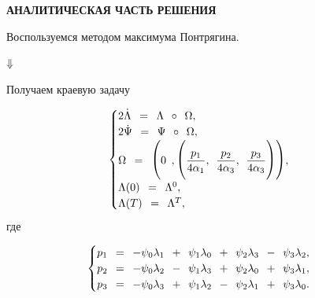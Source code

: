\documentclass[14pt]{extreport}
\begin{document}
\begin{landscape}
\begin{center}
 \huge{\textbf{АНАЛИТИЧЕСКАЯ ЧАСТЬ РЕШЕНИЯ}}
\end{center}

\begin{center}
\Large{Воспользуемся методом максимума Понтрягина.}
\end{center}

\large
\begin{center}
 $\Huge{\Downarrow}$
\end{center}

\begin{center}
\Large{Получаем краевую задачу}
\end{center}

\begin{equation}
\begin{cases}
\Large{2\dot{\Lambda}\ =\ \Lambda\ \circ\ \Omega,} \\
\Large{2\dot{\Psi}\ =\ \Psi\ \circ\ \Omega,} \\
\Large{\Omega\ =\ \bigg(0\ ,\bigg(\dfrac{p_1}{4\alpha_1},\ \dfrac{p_2}{4\alpha_3},\ \dfrac{p_3}{4\alpha_3}\bigg) \bigg),} \\
\Large{\Lambda(0)\ =\ \Lambda^0,} \\
\Large{\Lambda(T)\ =\ \Lambda^T,}
 \end{cases}
\end{equation}
где 

\begin{equation}
\begin{cases}
\Large{p_1\ =\ - \psi_0\lambda_1\ +\ \psi_1\lambda_0\ +\ \psi_2\lambda_3\ -\ \psi_3\lambda_2,} \\
\Large{p_2\ =\ - \psi_0\lambda_2\ -\ \psi_1\lambda_3\ +\ \psi_2\lambda_0\ +\ \psi_3\lambda_1,} \\
\Large{p_3\ =\ - \psi_0\lambda_3\ +\ \psi_1\lambda_2\ -\ \psi_2\lambda_1\ +\ \psi_3\lambda_0.}
 \end{cases}
\end{equation}
\end{landscape}
\end{document}
